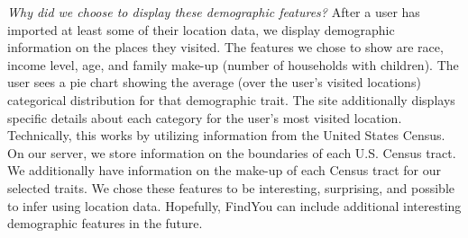 \emph{Why did we choose to display these demographic features?}
After a user has imported at least some of their location data, we display demographic information on the places they visited. 
The features we chose to show are race, income level, age, and family make-up (number of households with children). 
The user sees a pie chart showing the average (over the user's visited locations) categorical distribution for that demographic trait. 
The site additionally displays specific details about each category for the user's most visited location. 
Technically, this works by utilizing information from the United States Census. On our server, we store information on the boundaries of each U.S. Census tract. 
We additionally have information on the make-up of each Census tract for our selected traits.
We chose these features to be interesting, surprising, and possible to infer using location data. 
Hopefully, FindYou can include additional interesting demographic features in the future. 


